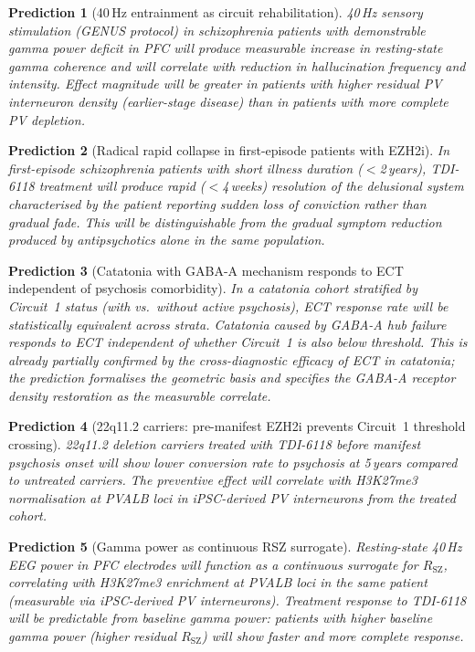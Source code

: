 \documentclass[12pt,a4paper]{article}
\newtheorem{prediction}{Prediction}
\newcommand{\RSZ}{R_{\mathrm{SZ}}}
\begin{document}
\begin{prediction}[40\,Hz entrainment as circuit rehabilitation]
\label{pred:genus}
40\,Hz sensory stimulation (GENUS protocol) in schizophrenia
patients with demonstrable gamma power deficit in PFC will
produce measurable increase in resting-state gamma coherence
and will correlate with reduction in hallucination frequency
and intensity. Effect magnitude will be greater in patients
with higher residual PV interneuron density (earlier-stage
disease) than in patients with more complete PV depletion.
\end{prediction}

\begin{prediction}[Radical rapid collapse in first-episode
patients with EZH2i]
\label{pred:collapse}
In first-episode schizophrenia patients with short illness
duration ($<$2\,years), TDI-6118 treatment will produce
rapid ($<$4\,weeks) resolution of the delusional system
characterised by the patient reporting sudden loss of
conviction rather than gradual fade. This will be
distinguishable from the gradual symptom reduction produced
by antipsychotics alone in the same population.
\end{prediction}

\begin{prediction}[Catatonia with GABA-A mechanism responds
to ECT independent of psychosis comorbidity]
\label{pred:ectstrata}
In a catatonia cohort stratified by Circuit~1 status (with
vs.\ without active psychosis), ECT response rate will be
statistically equivalent across strata. Catatonia caused
by GABA-A hub failure responds to ECT independent of
whether Circuit~1 is also below threshold. This is already
partially confirmed by the cross-diagnostic efficacy of
ECT in catatonia; the prediction formalises the geometric
basis and specifies the GABA-A receptor density restoration
as the measurable correlate.
\end{prediction}

\begin{prediction}[22q11.2 carriers: pre-manifest
EZH2i prevents Circuit~1 threshold crossing]
\label{pred:22q}
22q11.2 deletion carriers treated with TDI-6118 before
manifest psychosis onset will show lower conversion rate to
psychosis at 5\,years compared to untreated carriers. The
preventive effect will correlate with H3K27me3 normalisation
at PVALB loci in iPSC-derived PV interneurons from the
treated cohort.
\end{prediction}

\begin{prediction}[Gamma power as continuous RSZ surrogate]
\label{pred:gamma}
Resting-state 40\,Hz EEG power in PFC electrodes will function
as a continuous surrogate for $\RSZ$, correlating with
H3K27me3 enrichment at PVALB loci in the same patient (measurable
via iPSC-derived PV interneurons). Treatment response to
TDI-6118 will be predictable from baseline gamma power:
patients with higher baseline gamma power (higher residual
$\RSZ$) will show faster and more complete response.
\end{prediction}
\end{document}
